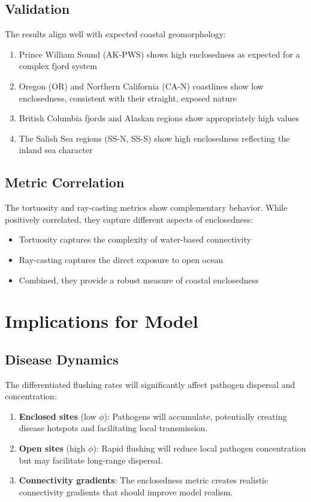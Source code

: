 \documentclass[11pt]{article}
\begin{document}
\subsection{Validation}
The results align well with expected coastal geomorphology:
\begin{enumerate}
    \item Prince William Sound (AK-PWS) shows high enclosedness as expected for a complex fjord system
    \item Oregon (OR) and Northern California (CA-N) coastlines show low enclosedness, consistent with their straight, exposed nature
    \item British Columbia fjords and Alaskan regions show appropriately high values
    \item The Salish Sea regions (SS-N, SS-S) show high enclosedness reflecting the inland sea character
\end{enumerate}

\subsection{Metric Correlation}
The tortuosity and ray-casting metrics show complementary behavior. While positively correlated, they capture different aspects of enclosedness:
\begin{itemize}
    \item Tortuosity captures the complexity of water-based connectivity
    \item Ray-casting captures the direct exposure to open ocean
    \item Combined, they provide a robust measure of coastal enclosedness
\end{itemize}

\section{Implications for Model}

\subsection{Disease Dynamics}
The differentiated flushing rates will significantly affect pathogen dispersal and concentration:

\begin{enumerate}
    \item \textbf{Enclosed sites} (low $\phi$): Pathogens will accumulate, potentially creating disease hotspots and facilitating local transmission.
    \item \textbf{Open sites} (high $\phi$): Rapid flushing will reduce local pathogen concentration but may facilitate long-range dispersal.
    \item \textbf{Connectivity gradients}: The enclosedness metric creates realistic connectivity gradients that should improve model realism.
\end{enumerate}
\end{document}
